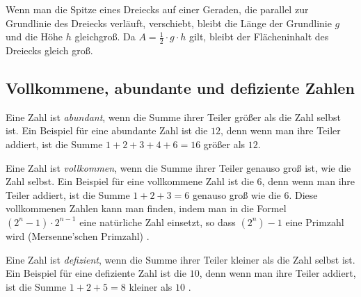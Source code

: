 \documentclass[a4paper,12pt]{article}
\begin{document}
\begin{figwindow}

Wenn man die Spitze eines Dreiecks auf einer Geraden, die parallel zur Grundlinie des Dreiecks verläuft, verschiebt, bleibt die Länge der Grundlinie $g$ und die Höhe $h$ gleichgroß. Da $A = \frac{1}{2}\cdot g \cdot h$ gilt, bleibt der Flächeninhalt des Dreiecks gleich groß.

\end{figwindow}

\newpage

\subsection{Vollkommene, abundante und defiziente Zahlen}

Eine Zahl ist {\em abundant}, wenn die Summe ihrer Teiler größer als die Zahl selbst ist. Ein Beispiel für eine abundante Zahl ist die $12$, denn wenn man ihre Teiler addiert, ist die Summe  $1 + 2 + 3 + 4 + 6 = 16$ größer als $12$.

Eine Zahl ist {\em vollkommen}, wenn die Summe ihrer Teiler genauso groß ist, wie die Zahl selbst. Ein Beispiel für eine vollkommene Zahl ist die $6$, denn wenn man ihre Teiler addiert, ist die Summe  $1 + 2 + 3 = 6$ genauso groß wie die $6$. Diese vollkommenen Zahlen kann man finden, indem man in die Formel $(2^n-1) \cdot 2^{n-1}$ eine natürliche Zahl einsetzt, so dass $(2^n)-1$ eine Primzahl wird (Mersenne'schen Primzahl) \cite{VollkommeneZahlenFinden}.

Eine Zahl ist {\em defizient}, wenn die Summe ihrer Teiler kleiner als die Zahl selbst ist. Ein Beispiel für eine defiziente Zahl ist die $10$, denn wenn man ihre Teiler addiert, ist die Summe  $1 + 2 + 5 = 8$ kleiner als $10$ \cite[S. 34-37]{Buch}. 

\newpage

\end{document}

